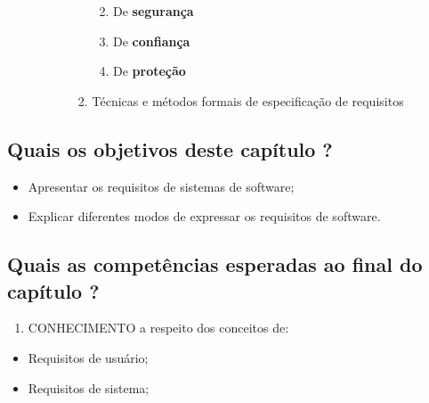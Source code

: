 \documentclass[
]{book}
\providecommand{\tightlist}{%
  \setlength{\itemsep}{0pt}\setlength{\parskip}{0pt}}
\begin{document}
\begin{itemize}
\begin{itemize}
\begin{itemize}
\begin{enumerate}
        \begin{enumerate}
        \def\labelenumii{\alph{enumii}.}
        \tightlist
        \item
          De \textbf{segurança}
        \item
          De \textbf{confiança}
        \item
          De \textbf{proteção}
        \end{enumerate}
      \item
        Técnicas e métodos formais de especificação de requisitos
      \end{enumerate}
    \end{itemize}
  \end{itemize}
\end{itemize}

\hypertarget{quais-os-objetivos-deste-capuxedtulo}{%
\subsection*{Quais os objetivos deste capítulo ?}\label{quais-os-objetivos-deste-capuxedtulo}}

\begin{itemize}
\tightlist
\item
  Apresentar os requisitos de sistemas de software;
\item
  Explicar diferentes modos de expressar os requisitos de software.
\end{itemize}

\hypertarget{quais-as-competuxeancias-esperadas-ao-final-do-capuxedtulo}{%
\subsection*{Quais as competências esperadas ao final do capítulo ?}\label{quais-as-competuxeancias-esperadas-ao-final-do-capuxedtulo}}

\begin{enumerate}
\def\labelenumi{\arabic{enumi}.}
\tightlist
\item
  CONHECIMENTO a respeito dos conceitos de:
\end{enumerate}

\begin{itemize}
\tightlist
\item
  Requisitos de usuário;
\item
  Requisitos de sistema;
\end{itemize}
\end{document}
